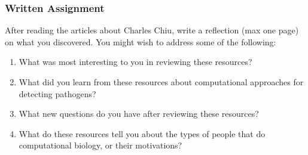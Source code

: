 \documentclass{article}
\begin{document}
\subsubsection*{Written Assignment} 
After reading the articles about Charles Chiu, write
a reflection (max one page) on what you discovered. You might wish to address some of the following: 

\begin{enumerate}
\item What was most interesting to you in reviewing these resources?
\item What did you learn from these resources about computational approaches for detecting pathogens?
\item What new questions do you have after reviewing these resources?
\item What do these resources tell you about the types of people that do computational biology, or their motivations?
\end{enumerate}

\EndAccSupp{}
\end{document}
